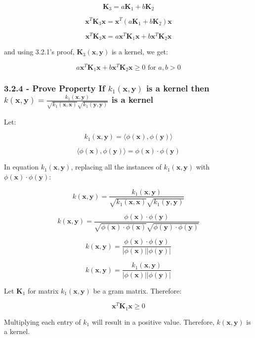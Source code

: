 \documentclass[10pt]{article}
\begin{document}
\[
\textbf{K}_{3} = a \textbf{K}_{1} + b  \textbf{K}_{2}
\]

\[
\textbf{x}^{T} \textbf{K}_3 \textbf{x} = \textbf{x}^{T} ( a \textbf{K}_{1} + b  \textbf{K}_{2}) \textbf{x}
\]

\[
\textbf{x}^{T} \textbf{K}_3 \textbf{x} = a \textbf{x}^{T} \textbf{K}_1 \textbf{x} + b \textbf{x}^{T} \textbf{K}_2 \textbf{x}
\]

and using 3.2.1's proof, $\textbf{K}_{3}(\textbf{x},\textbf{y})$ is a kernel, we get: 

\[
a \textbf{x}^{T} \textbf{K}_1 \textbf{x} + b \textbf{x}^{T} \textbf{K}_2 \textbf{x} \geq 0 \text{ for } a,b > 0
\]


\subsubsection{3.2.4 - Prove Property If $k_1(\textbf{x},\textbf{y})$ is a kernel then $k(\textbf{x},\textbf{y}) = \frac{k_1(\textbf{x},\textbf{y})}{\sqrt{k_1(\textbf{x},\textbf{x})} \sqrt{k_1(\textbf{y},\textbf{y})}}$ is a kernel}

Let:

\[
k_1(\textbf{x},\textbf{y}) = \langle \phi(\textbf{x}), \phi(\textbf{y}) \rangle
\]

\[
\langle \phi(\textbf{x}), \phi(\textbf{y}) \rangle = \phi (\textbf{x}) \cdot \phi (\textbf{y})
\]

In equation $k_1(\textbf{x},\textbf{y})$, replacing all the instances of $k_1(\textbf{x},\textbf{y})$ with $ \phi (\textbf{x}) \cdot \phi (\textbf{y})$: 


\[
k(\textbf{x},\textbf{y}) = \frac{k_1(\textbf{x},\textbf{y})}{\sqrt{k_1(\textbf{x},\textbf{x})} \sqrt{k_1(\textbf{y},\textbf{y})}}
\]

\[
k(\textbf{x},\textbf{y}) = \frac{\phi (\textbf{x}) \cdot \phi (\textbf{y})}{\sqrt{\phi (\textbf{x}) \cdot \phi (\textbf{x})} \sqrt{\phi (\textbf{y}) \cdot \phi (\textbf{y})}}
\]

\[
k(\textbf{x},\textbf{y}) = \frac{\phi (\textbf{x}) \cdot \phi (\textbf{y})}{|\phi (\textbf{x})| |\phi (\textbf{y})|}
\]

\[
k(\textbf{x},\textbf{y}) = \frac{k_1(\textbf{x},\textbf{y})} {|\phi (\textbf{x})| |\phi (\textbf{y})|}
\]

Let $\textbf{K}_1$ for matrix $k_1(\textbf{x},\textbf{y})$ be a gram matrix. Therefore: 

\[
\textbf{x}^{T} \textbf{K}_1 \textbf{x} \geq 0
\]

Multiplying each entry of $k_1$ will result in a positive value. Therefore, $k(\textbf{x},\textbf{y})$ is a kernel.


\pagebreak
\end{document}
